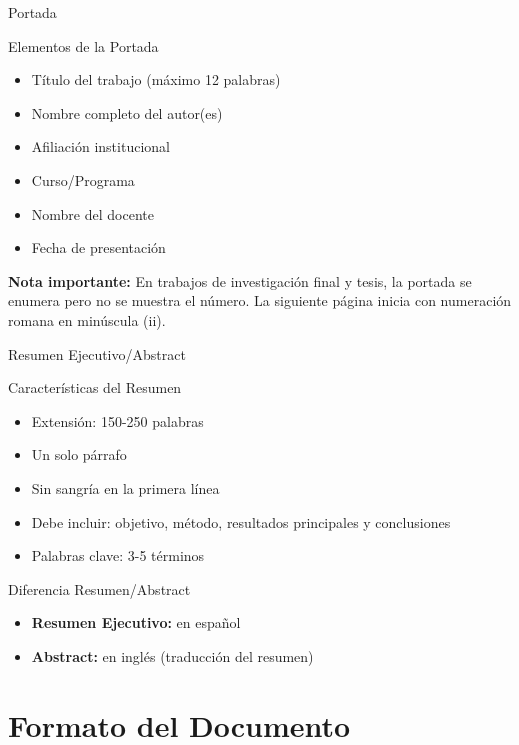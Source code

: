 \documentclass[spanish,aspectratio=169]{beamer}
\begin{document}
	\begin{frame}{Portada}
		\begin{block}{Elementos de la Portada}
			\begin{itemize}
				\item Título del trabajo (máximo 12 palabras)
				\item Nombre completo del autor(es)
				\item Afiliación institucional
				\item Curso/Programa
				\item Nombre del docente
				\item Fecha de presentación
			\end{itemize}
		\end{block}
		
		\vspace{0.3cm}
		\textbf{Nota importante:} En trabajos de investigación final y tesis, la portada se enumera pero \alert{no se muestra el número}. La siguiente página inicia con numeración romana en minúscula (ii).
	\end{frame}
	
	\begin{frame}{Resumen Ejecutivo/Abstract}
		\begin{block}{Características del Resumen}
			\begin{itemize}
				\item Extensión: 150-250 palabras
				\item Un solo párrafo
				\item Sin sangría en la primera línea
				\item Debe incluir: objetivo, método, resultados principales y conclusiones
				\item Palabras clave: 3-5 términos
			\end{itemize}
		\end{block}
		
		\begin{alertblock}{Diferencia Resumen/Abstract}
			\begin{itemize}
				\item \textbf{Resumen Ejecutivo:} en español
				\item \textbf{Abstract:} en inglés (traducción del resumen)
			\end{itemize}
		\end{alertblock}
	\end{frame}
	
	\section{Formato del Documento}
	
\end{document}
